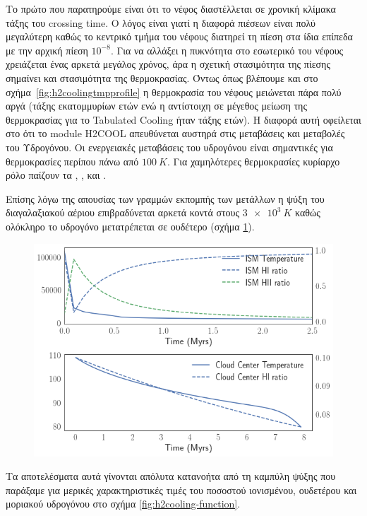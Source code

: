 	Το πρώτο που παρατηρούμε είναι ότι το νέφος διαστέλλεται σε χρονική κλίμακα τάξης του crossing time. Ο λόγος είναι γιατί η διαφορά πιέσεων είναι πολύ μεγαλύτερη καθώς το κεντρικό τμήμα του νέφους διατηρεί τη πίεση στα ίδια επίπεδα με την αρχική πίεση $10^{-8}$. Για να αλλάξει η πυκνότητα στο εσωτερικό του νέφους χρειάζεται ένας αρκετά μεγάλος χρόνος, άρα η σχετική στασιμότητα της πίεσης σημαίνει και στασιμότητα της θερμοκρασίας. Όντως όπως βλέπουμε και στο σχήμα~\ref{fig:h2coolingtmpprofile} η θερμοκρασία του νέφους μειώνεται πάρα πολύ αργά (τάξης εκατομμυρίων ετών ενώ η αντίστοιχη σε μέγεθος μείωση της θερμοκρασίας για το Tabulated Cooling ήταν τάξης ετών). Η διαφορά αυτή οφείλεται στο ότι το module H2COOL απευθύνεται αυστηρά στις μεταβάσεις και μεταβολές του Υδρογόνου. Οι ενεργειακές μεταβάσεις του υδρογόνου είναι σημαντικές για θερμοκρασίες περίπου πάνω από $\SI{100}{K}$. Για χαμηλότερες θερμοκρασίες κυρίαρχο ρόλο παίζουν τα , ,  και .
	
	Επίσης λόγω της απουσίας των γραμμών εκπομπής των μετάλλων η ψύξη του διαγαλαξιακού αέριου επιβραδύνεται αρκετά κοντά στους $\SI{3e3}{K}$ καθώς ολόκληρο το υδρογόνο μετατρέπεται σε ουδέτερο (σχήμα \ref{fig:h2coolingtmpcenterism}). 
	
	\begin{figure}[h]
		\centering
		\includegraphics[width=1\linewidth]{DataImages/H2CoolingTMPcenterISM}
		\caption{}
		\label{fig:h2coolingtmpcenterism}
	\end{figure}

		Τα αποτελέσματα αυτά γίνονται απόλυτα κατανοήτα από τη καμπύλη ψύξης που παράξαμε για μερικές χαρακτηριστικές τιμές του ποσοστού ιονισμένου, ουδετέρου και μοριακού υδρογόνου στο σχήμα \ref{fig:h2cooling-function}.
	



